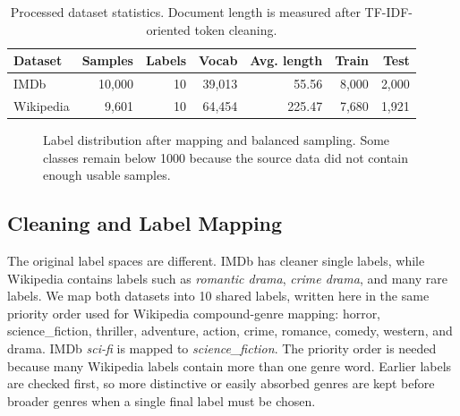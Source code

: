 \documentclass[12pt,a4paper]{article}
\begin{document}
\begin{table}[H]
\centering
\begin{tabular}{lrrrrrr}
\toprule
\textbf{Dataset} & \textbf{Samples} & \textbf{Labels} & \textbf{Vocab} & \textbf{Avg. length} & \textbf{Train} & \textbf{Test} \\
\midrule
IMDb & 10,000 & 10 & 39,013 & 55.56 & 8,000 & 2,000 \\
Wikipedia & 9,601 & 10 & 64,454 & 225.47 & 7,680 & 1,921 \\
\bottomrule
\end{tabular}
\caption{Processed dataset statistics. Document length is measured after TF-IDF-oriented token cleaning.}
\label{tab:dataset_stats}
\end{table}

\begin{figure}[H]
\centering
{}
\caption{Label distribution after mapping and balanced sampling. Some classes remain below 1000 because the source data did not contain enough usable samples.}
\label{fig:label_dist}
\end{figure}

\subsection{Cleaning and Label Mapping}
The original label spaces are different. IMDb has cleaner single labels, while Wikipedia contains labels such as \textit{romantic drama}, \textit{crime drama}, and many rare labels. We map both datasets into 10 shared labels, written here in the same priority order used for Wikipedia compound-genre mapping: horror, science\_fiction, thriller, adventure, action, crime, romance, comedy, western, and drama. IMDb \textit{sci-fi} is mapped to \textit{science\_fiction}. The priority order is needed because many Wikipedia labels contain more than one genre word. Earlier labels are checked first, so more distinctive or easily absorbed genres are kept before broader genres when a single final label must be chosen.
\end{document}
